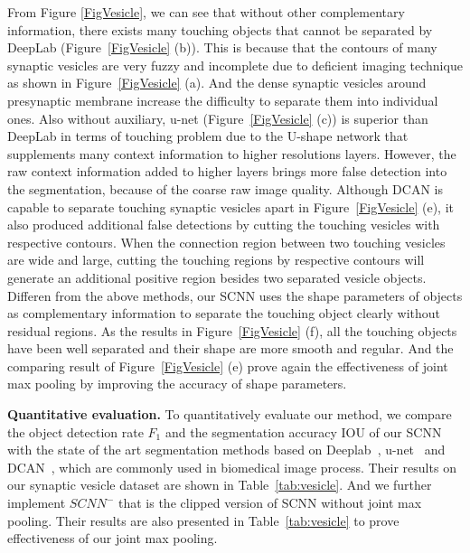 From Figure \ref{FigVesicle}, we can see that without other complementary information, there exists many touching objects that cannot be separated by DeepLab (Figure~\ref{FigVesicle} (b)).
This is because that the contours of many synaptic vesicles are very fuzzy and incomplete due to deficient imaging technique as shown in Figure~\ref{FigVesicle} (a).
And the dense synaptic vesicles around presynaptic membrane increase the difficulty to separate them into individual ones.
Also without auxiliary, u-net (Figure~\ref{FigVesicle} (c)) is superior than DeepLab in terms of touching problem due to the U-shape network that supplements many context information to higher resolutions layers.
However, the raw context information added to higher layers brings more false detection into the segmentation, because of the coarse raw image quality.
Although DCAN is capable to separate touching synaptic vesicles apart in Figure~\ref{FigVesicle} (e), it also produced additional false detections by cutting the touching vesicles with respective contours.
When the connection region between two touching vesicles are wide and large, cutting the touching regions by respective contours will generate an additional positive region besides two separated vesicle objects.
Differen from the above methods, our SCNN uses the shape parameters of objects as complementary information to separate the touching object clearly without residual regions.
As the results in Figure~\ref{FigVesicle} (f), all the touching objects have been well separated and their shape are more smooth and regular.
And the comparing result of Figure~\ref{FigVesicle} (e) prove again the effectiveness of joint max pooling by improving the accuracy of shape parameters.

\noindent\textbf{Quantitative evaluation.}
To quantitatively evaluate our method, we compare the object detection rate $F_1$ and the segmentation accuracy IOU of our SCNN with the state of the art segmentation methods based on Deeplab~\cite{Chen2014a}, u-net~\cite{Ronneberger2015} and DCAN~\cite{Chen2016b}, which are commonly used in biomedical image process.
Their results on our synaptic vesicle dataset are shown in Table~\ref{tab:vesicle}.
And we further implement $SCNN^{-}$ that is the clipped version of SCNN without joint max pooling.
Their results are also presented in Table~\ref{tab:vesicle} to prove effectiveness of our joint max pooling.

